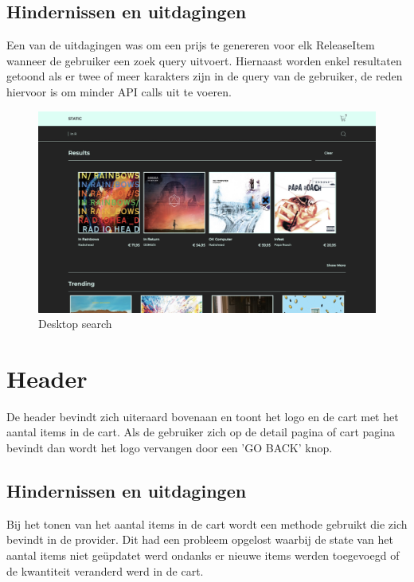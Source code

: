 \subsection{Hindernissen en uitdagingen}

Een van de uitdagingen was om een prijs te genereren voor elk ReleaseItem wanneer de gebruiker een zoek query uitvoert. Hiernaast worden enkel resultaten getoond als er twee of meer karakters zijn in de query van de gebruiker, de reden hiervoor is om minder API calls uit te voeren.

\begin{figure}
	\centering
	\includegraphics[width=1\linewidth]{graphics/desktopSearch}
	\caption[Desktop search]{Desktop search}
	\label{fig:desktopSearch}
\end{figure}

\section{Header}

De header bevindt zich uiteraard bovenaan en toont het logo en de cart met het aantal items in de cart. Als de gebruiker zich op de detail pagina of cart pagina bevindt dan wordt het logo vervangen door een 'GO BACK' knop.

\subsection{Hindernissen en uitdagingen}

Bij het tonen van het aantal items in de cart wordt een methode gebruikt die zich bevindt in de provider. Dit had een probleem opgelost waarbij de state van het aantal items niet geüpdatet werd ondanks er nieuwe items werden toegevoegd of de kwantiteit veranderd werd in de cart.